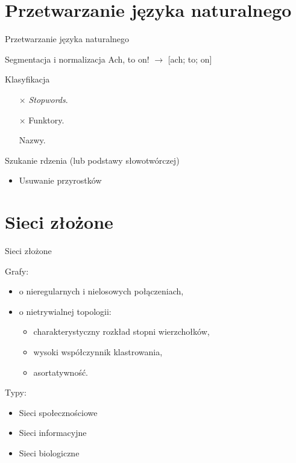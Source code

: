 \documentclass{beamer}
\begin{document}
\section{Przetwarzanie języka naturalnego}
\begin{frame}{Przetwarzanie języka naturalnego}
  \begin{block}{Segmentacja i normalizacja}
    Ach, to on! $\to$ [ach; to; on]
  \end{block}
  \pause
  \begin{block}{Klasyfikacja}
    \begin{itemize}
      \item[$\times$] \textit{Stopwords}.
      \item[$\times$] Funktory. 
      \item[\checkmark] Nazwy. 
    \end{itemize}

  \end{block}
  \pause
  \begin{block}{Szukanie rdzenia (lub podstawy słowotwórczej)}
    \begin{itemize}
      \item Usuwanie przyrostków
    \end{itemize}
  \end{block}
\end{frame}

\section{Sieci złożone}
\begin{frame}{Sieci złożone}
  \begin{block}{Grafy:}
    \begin{itemize}
      \item o nieregularnych i nielosowych połączeniach,
      \item o nietrywialnej topologii:
      \begin{itemize}
        \item charakterystyczny rozkład stopni wierzchołków,
        \item wysoki współczynnik klastrowania,
        \item asortatywność.
      \end{itemize}
    \end{itemize}
  \end{block}
  \pause
  \begin{block}{Typy:}
    \begin{itemize}
      \item Sieci społecznościowe
      \item Sieci informacyjne
      \item Sieci biologiczne
    \end{itemize}
  \end{block}
\end{frame}
\end{document}
